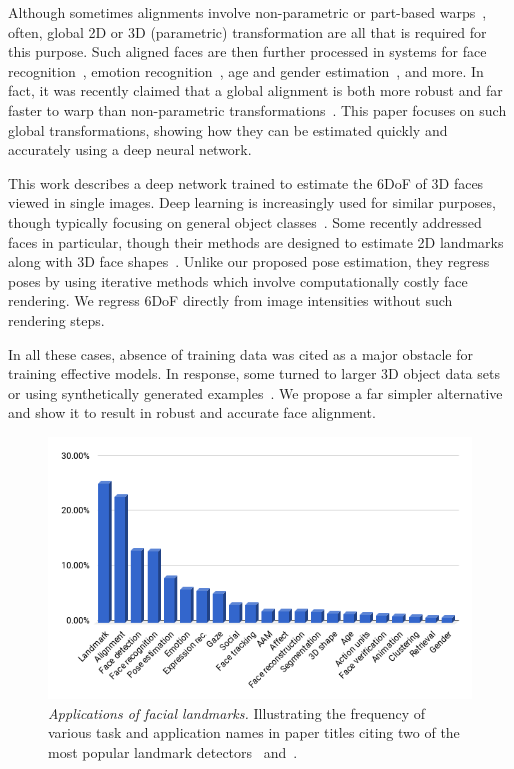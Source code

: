 \documentclass[10pt,twocolumn,letterpaper]{article}
\newcommand{\minisection}[1]{\vspace{1mm}\noindent{\bf #1}}
\begin{document}
Although sometimes alignments involve non-parametric or part-based warps~\cite{hassner2013viewing,hassner2013single}, often, global 2D or 3D (parametric) transformation are all that is required for this purpose. Such aligned faces are then further processed in systems for face recognition~\cite{chen2014cross,ding2016multi,zhu2015high}, emotion recognition~\cite{huang2014improved,levi2015emotion}, age and gender estimation~\cite{eidinger2013age,gurpinar2016kernel,LH:CVPRw15:age}, and more. In fact, it was recently claimed that a global alignment is both more robust and far faster to warp than non-parametric transformations~\cite{masi2017rapid,masi16dowe}. This paper focuses on such global transformations, showing how they can be estimated quickly and accurately using a deep neural network.


\minisection{Deep pose estimation.} This work describes a deep network trained to estimate the 6DoF of 3D faces viewed in single images. Deep learning is increasingly used for similar purposes, though typically focusing on general object classes~\cite{bansal2016marr,poirson2016fast,su2015render}. Some recently addressed faces in particular, though their methods are designed to estimate 2D landmarks along with 3D face shapes~\cite{jourabloo2016large,7961750,zhu2015}. Unlike our proposed pose estimation, they regress poses by using iterative methods which involve computationally costly face rendering. We regress 6DoF directly from image intensities without such rendering steps.

In all these cases, absence of training data was cited as a major obstacle for training effective models. In response, some turned to larger 3D object data sets~\cite{xiang2014beyond,xiang2016objectnet3d} or using synthetically generated examples~\cite{richardson2016learning}. We propose a far simpler alternative and show it to result in robust and accurate face alignment.



\begin{figure}[t]
\centering
\includegraphics[width=\linewidth]{figures/word_freq_e}
\caption{
{\em Applications of facial landmarks.} Illustrating the frequency of various task and application names in paper titles citing two of the most popular landmark detectors~\cite{zhu2012face} and~\cite{xiong2013supervised}.}\label{fig:wordfreq}
\end{figure}
\end{document}
